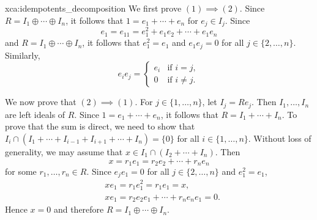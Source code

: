 \begin{sol}{xca:idempotents_decomposition}
    We first prove $(1)\implies (2)$. Since $R=I_1\oplus\cdots\oplus I_n$, 
    it follows that $1=e_1+\cdots+e_n$ for $e_j\in I_j$. Since 
    \[
    e_1=e_11=e_1^2+e_1e_2+\cdots+e_1e_n
    \]
    and $R=I_1\oplus\cdots\oplus I_n$, it follows that $e_1^2=e_1$ and
    $e_1e_j=0$ for all $j\in\{2,\dots,n\}$. Similarly, 
    \[
    e_ie_j=\begin{cases}
        e_i & \text{if $i=j$},\\
        0 & \text{if $i\ne j$.}
        \end{cases}
    \]
    
    We now prove that $(2)\implies (1)$. For $j\in\{1,\dots,n\}$, let $I_j=Re_j$. Then 
    $I_1,\dots,I_n$ are left ideals of $R$. Since $1=e_1+\cdots+e_n$, it follows that 
    $R=I_1+\cdots+I_n$. To prove that the sum is direct, we need to show
    that $I_i\cap (I_1+\cdots+I_{i-1}+I_{i+1}+\cdots+I_n)=\{0\}$ for all $i\in\{1,\dots,n\}$. 
    Without loss of generality, we may assume that $x\in I_1\cap (I_{2}+\cdots+I_n)$. Then 
    \[
    x=r_1e_1=r_2e_2+\cdots+r_ne_n
    \]
    for some $r_1,\dots,r_n\in R$. Since $e_je_1=0$ for all $j\in\{2,\dots,n\}$ and
    $e_1^2=e_1$,  
    \begin{align*}
        & xe_1=r_1e_1^2=r_1e_1=x,\\
        & xe_1=r_2e_2e_1+\cdots+r_ne_ne_1=0.
    \end{align*}
    Hence $x=0$ and therefore $R=I_1\oplus\cdots\oplus I_n$.     
\end{sol}



    

